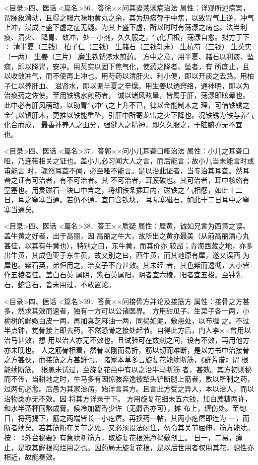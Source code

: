\documentclass[a4paper,12pt,UTF8,twoside]{ctexbook}
\begin{document}
<目录>四、医话
<篇名>36．答徐××问其妻荡漾病治法
属性：详观所述病案，谓脉象滑动，且得之服六味地黄丸之余，其为热痰郁于中焦，以致胃气上逆，冲气 
上冲，浸成上盛下虚之症无疑。为其上盛下虚，所以时时有荡漾之病也。法当利痰、清火、 
降胃、敛冲，处一小剂，久久服之，气化归根，荡漾自愈。拟方于下∶ 
清半夏（三钱） 柏子仁（三钱） 生赭石（三钱轧末） 生杭芍（三钱） 生芡实（一两） 生姜（三片） 
磨生铁锈浓水煎药。 
方中之意，用半夏、赭石以利痰、坠痰，即以降胃，安冲。用芡实以固下焦气化，使药之降者、坠者，有 
所底止，且以收敛冲气，而不使再上冲也。用芍药以清肝火、利小便，即以开痰之去路。用柏子仁以养肝血、 
滋肾水，即以调半夏之辛燥。用生姜以透窍络，通神明，即以为治痰药之佐使。至用铁锈水煎药者， 
诚以诸风眩晕，皆属于肝，荡漾即眩晕也。此中必有肝风萌动，以助胃气冲气之上升不已，律以金能制木之 
理，可借铁锈之金气以镇肝木，更推以铁能重坠，引肝中所寄龙雷之火下降也。况铁锈为铁与养气化合而成， 
最善补养人之血分，强健人之精神，即久久服之，于脏腑亦无不宜也。 

<目录>四、医话
<篇名>37．答郭××问小儿耳聋口哑治法
属性：小儿之耳聋口哑，乃连带相关之证也。盖小儿必习闻大人之言，而后能言；故小儿当未能言时或甫能言 
时，骤然耳聋不闻，必至哑不能言。是以治此证者，当专治其耳聋。然耳聋之证有可治者，有不可治者。其 
不可治者，耳膜破也。其可治者，耳中核络有窒塞也。用灵磁石一块口中含之，将细铁条插耳内，磁铁之 
气相感，如此十二日，耳之窒塞当通。若仍不通，宜口含铁块， 
耳际塞磁石，如此十二日耳中之窒塞当通矣。 

<目录>四、医话
<篇名>38．答王××质疑
属性：犀黄，诚如兄言为西黄之误。盖牛黄之好者，出于高丽，因 
高丽之牛大，故所出之黄亦最美（从前高丽清心丸甚佳，以其有牛黄也），特别之曰，东牛黄，而其价亦 
较昂；青海西藏之地，亦多出牛黄，其成色亚于东牛黄，故又别之曰，西牛黄，而其地原有犀，遂又误西 
为犀也。紫石英，弟恒用之，治女子不育甚效。其未经 者，其色紫而透彻，大小皆作五棱者佳。盖白石英 
属阴，紫石英属阳，阴者宜六棱，阳者宜五梭。至钟乳石，蛇含石，皆未用过，不敢置论。 

<目录>四、医话
<篇名>39．答黄××问接骨方并论及接筋方
属性：接骨之方甚多，然求其效而速者，独有一方可以公诸医界。 
方用甜瓜子、生菜子各一两，小榆树的鲜嫩白皮一两，再加真芝麻油一两，同捣如泥，敷患处，以布缠 
之。不过半点钟，觉骨接上即去药，不然恐骨之接处起节。自得此方后，门人李××曾用以治马甚效，想 
用以治人亦无不效也。且试验可在数刻之间，设有不效，再用他方亦未晚也。 
人之筋骨相着，然骨以刚而易折，筋以韧而难断，是以方书中治接骨之方甚伙，而接筋之方甚鲜也。 
诸家本草多言旋复花能续断筋，《群芳谱》谓 根能续断筋。 根愚未试过，至旋复花邑中有以之治牛马断筋 
者，甚效。其方初则秘而不传，当耕地之时，牛马多有因惊骇奔逸被犁头铲断腿上筋者，敷以所制之药， 
过两旬必愈。后愚为其家治病，始详言其方。且言此方受之异人，本以治人，而以治物类亦无不效。因 
将其方详录于下。 
方用旋复花细末五六钱，加白蔗糖两许，和水半茶杯同熬成膏。候冷加麝香少许（无麝香亦可），摊 
布上，缠伤处。至旬日，将药揭下，筋之两端皆长一小疙瘩。再换药一帖，其两小疙瘩即连为 
一，而断者续矣。若其筋断在关节之处，又必须设法闭住，勿令其关节屈伸，筋方能续。 
按∶《外台秘要》有急续断筋方，取旋复花根洗净捣敷创上。 
日一，二易，瘥止，是取其鲜根捣烂用之也。因药局无旋复花根，是以后世用者权用其花，想性亦相近，故能奏效。 
\end{document}
